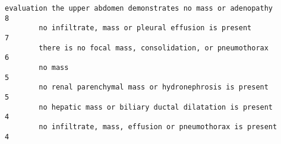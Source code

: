 \documentclass[11pt]{article}
\begin{document}
\begin{Verbatim}[commandchars=\\\{\}]
        evaluation the upper abdomen demonstrates no mass or adenopathy                                                                                                                                                                                                                                                                                                                                                                 8
        no infiltrate, mass or pleural effusion is present                                                                                                                                                                                                                                                                                                                                                                              7
        there is no focal mass, consolidation, or pneumothorax                                                                                                                                                                                                                                                                                                                                                                          6
        no mass                                                                                                                                                                                                                                                                                                                                                                                                                         5
        no renal parenchymal mass or hydronephrosis is present                                                                                                                                                                                                                                                                                                                                                                          5
        no hepatic mass or biliary ductal dilatation is present                                                                                                                                                                                                                                                                                                                                                                         4
        no infiltrate, mass, effusion or pneumothorax is present                                                                                                                                                                                                                                                                                                                                                                        4

\end{Verbatim}
\end{document}
